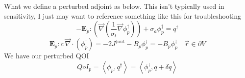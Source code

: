 \documentclass{article}
\newcommand{\vr}{\vec{r}}
\newcommand{\bra}{\left\langle}
\newcommand{\ket}{\right\rangle}
\newcommand{\vgrad}{\vec{\nabla}}
\newcommand{\bound}{\partial V}
\newcommand{\Edd}{\mathbf{E}}
\newcommand{\sigt}{\sigma_t}
\newcommand{\siga}{\sigma_a}
\newcommand{\isigt}{c}
\newcommand{\scalSource}{q}
\newcommand{\scalResp}{q^\dag}
\newcommand{\qoi}{QoI}
\begin{document}
What we define a perturbed adjoint as below. This isn't typically used in sensitivity, I just may want to reference something like this for troubleshooting
\begin{equation}
- \Edd_p : \left( \vgrad \left( \frac{1}{\sigt}\vgrad \phi^\dag_p \right) \right) + \siga \phi^\dag_p = \scalResp
\end{equation}
\begin{equation}
\Edd_p : \isigt \ \vec{\nabla} \cdot \left( \phi^\dag_p \right)  = - 2J^{\dag \text{out}} - B_p \phi^\dag_p =  - B_p \phi^\dag_p \quad \vr \in \bound
\end{equation}
We have our perturbed QOI
\begin{equation}
\qoi_p=\bra \phi_p , \scalResp \ket = \bra \phi^\dag_p , \scalSource +\delta \scalSource \ket 
\end{equation}
\end{document}
